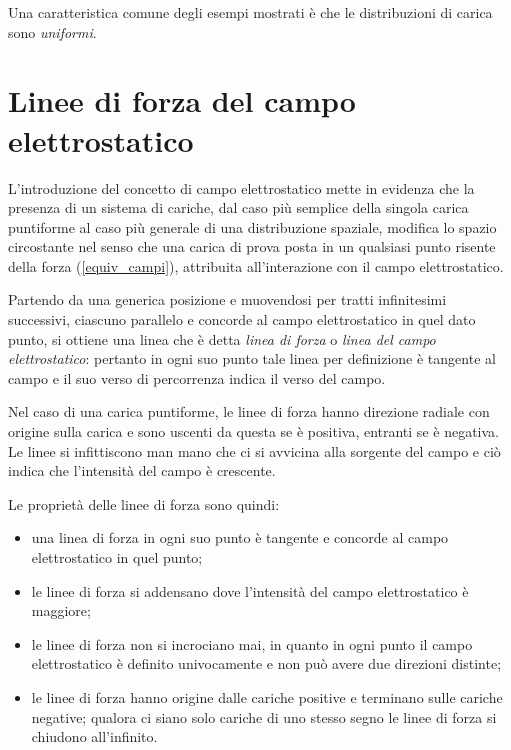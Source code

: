 \documentclass[class=book, crop=false, oneside, 12pt]{standalone}
\begin{document}
Una caratteristica comune degli esempi mostrati è che le distribuzioni di carica sono \emph{uniformi}.

\section{Linee di forza del campo elettrostatico}
L'introduzione del concetto di campo elettrostatico mette in evidenza che la presenza di un sistema di cariche, dal caso più semplice della singola carica puntiforme al caso più generale di una distribuzione spaziale, modifica lo spazio circostante nel senso che una carica di prova posta in un qualsiasi punto risente della forza (\ref{equiv_campi}), attribuita all'interazione con il campo elettrostatico.

Partendo da una generica posizione e muovendosi per tratti infinitesimi successivi, ciascuno parallelo e concorde al campo elettrostatico in quel dato punto, si ottiene una linea che è detta \emph{linea di forza} o \emph{linea del campo elettrostatico}: 
pertanto in ogni suo punto tale linea per definizione è tangente al campo e il suo verso di percorrenza indica il verso del campo.

Nel caso di una carica puntiforme, le linee di forza hanno direzione radiale con origine sulla carica e sono uscenti da questa se è positiva, entranti se è negativa. 
Le linee si infittiscono man mano che ci si avvicina alla sorgente del campo e ciò indica che l'intensità del campo è crescente. 

Le proprietà delle linee di forza sono quindi:
\begin{itemize}
    \item una linea di forza in ogni suo punto è tangente e concorde al campo elettrostatico in quel punto;
    \item le linee di forza si addensano dove l'intensità del campo elettrostatico è maggiore; 
    \item le linee di forza non si incrociano mai, in quanto in ogni punto il campo elettrostatico è definito univocamente e non può avere due direzioni distinte;
    \item le linee di forza hanno origine dalle cariche positive e terminano sulle cariche negative; qualora ci siano solo cariche di uno stesso segno le linee di forza si chiudono all'infinito.
\end{itemize}
\end{document}
